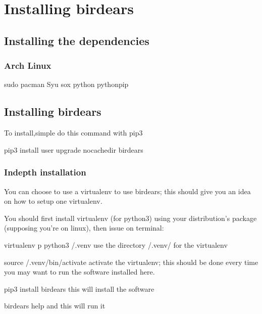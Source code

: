 \documentclass[letterpaper,10pt,english]{sphinxmanual}
\begin{document}
\chapter{Installing birdears}
\label{\detokenize{index:installing-birdears}}

\section{Installing the dependencies}
\label{\detokenize{index:installing-the-dependencies}}

\subsection{Arch Linux}
\label{\detokenize{index:arch-linux}}
\begin{sphinxVerbatim}[commandchars=\\\{\}]
sudo pacman \PYGZhy{}Syu sox python python\PYGZhy{}pip
\end{sphinxVerbatim}


\section{Installing birdears}
\label{\detokenize{index:id1}}
\sphinxAtStartPar
To install,simple do this command with pip3

\begin{sphinxVerbatim}[commandchars=\\\{\}]
pip3 install \PYGZhy{}\PYGZhy{}user \PYGZhy{}\PYGZhy{}upgrade \PYGZhy{}\PYGZhy{}no\PYGZhy{}cache\PYGZhy{}dir birdears
\end{sphinxVerbatim}


\subsection{In\sphinxhyphen{}depth installation}
\label{\detokenize{index:in-depth-installation}}
\sphinxAtStartPar
You can choose to use a virtualenv to use birdears; this should give you
an idea on how to setup one virtualenv.

\sphinxAtStartPar
You should first install virtualenv (for python3) using your
distribution’s package (supposing you’re on linux), then issue on terminal:

\begin{sphinxVerbatim}[commandchars=\\\{\}]
virtualenv \PYGZhy{}p python3 \PYGZti{}/.venv \PYGZsh{} use the directory \PYGZti{}/.venv/ for the virtualenv

source \PYGZti{}/.venv/bin/activate   \PYGZsh{} activate the virtualenv; this should be done
                              \PYGZsh{} every time you may want to run the software
                              \PYGZsh{} installed here.

pip3 install birdears         \PYGZsh{} this will install the software

birdears \PYGZhy{}\PYGZhy{}help               \PYGZsh{} and this will run it
\end{sphinxVerbatim}
\end{document}
